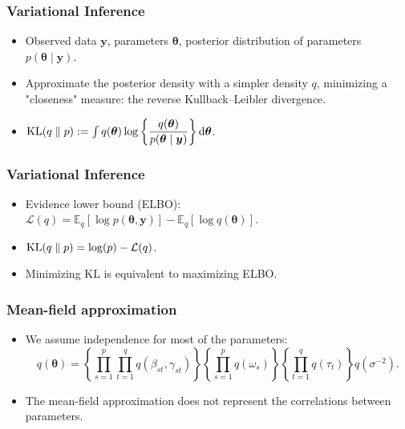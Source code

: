 \documentclass{beamer}
\DeclareMathOperator*{\KL}{{\rm KL}}
\begin{document}
\begin{frame}
\frametitle{Variational Inference}
\begin{itemize}
\item Observed data $\boldsymbol{y}$, parameters $\boldsymbol{\theta}$, posterior distribution of parameters $p(\boldsymbol{\theta} \mid \boldsymbol{y})$.
\item Approximate the posterior density with a simpler density $q$, minimizing a "closeness" measure: the reverse Kullback--Leibler divergence.
\item $\KL(q\parallel p) := \int q(\boldsymbol{\theta})\log \left\lbrace\dfrac{q(\boldsymbol{\theta})}{p(\boldsymbol{\theta} \mid \boldsymbol{y})}\right\rbrace \mathrm{d}\boldsymbol{\theta}$.
\end{itemize}
\end{frame}
\begin{frame}
\frametitle{Variational Inference}
\begin{itemize}
\item Evidence lower bound (ELBO): $\mathcal{L}(q) = \mathbb{E}_q\left[\log p(\boldsymbol{\theta},\boldsymbol{y})\right] - \mathbb{E}_q\left[\log q(\boldsymbol{\theta})\right]$.
\item $\KL(q\parallel p) = \log(p) - \mathcal{L}(q)$.
\item Minimizing KL is equivalent to maximizing ELBO.
\end{itemize}
\end{frame}

\begin{frame}
\frametitle{Mean-field approximation}
\begin{itemize}
\item We assume independence for most of the parameters:
$$
q(\boldsymbol{\theta}) = \left\lbrace\prod_{s=1}^p\prod_{t=1}^qq(\beta_{st},\gamma_{st})\right\rbrace\left\lbrace\prod_{s=1}^pq(\omega_s)\right\rbrace\left\lbrace\prod_{t=1}^qq(\tau_t)\right\rbrace q(\sigma^{-2}).
$$
\item The mean-field approximation does not represent the correlations between parameters.
\end{itemize}
\begin{figure}
\centering
{}\end{figure}
\end{frame}
\end{document}
